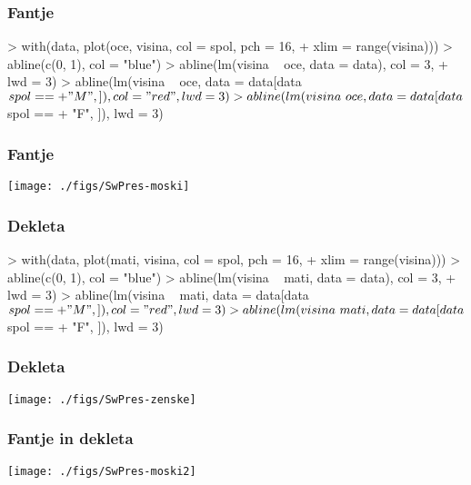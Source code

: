 \begin{frame}[fragile]
\frametitle{Fantje}
\begin{Schunk}
\begin{Sinput}
> with(data, plot(oce, visina, col = spol, pch = 16, 
+     xlim = range(visina)))
> abline(c(0, 1), col = "blue")
> abline(lm(visina ~ oce, data = data), col = 3, 
+     lwd = 3)
> abline(lm(visina ~ oce, data = data[data$spol == 
+     "M", ]), col = "red", lwd = 3)
> abline(lm(visina ~ oce, data = data[data$spol == 
+     "F", ]), lwd = 3)
\end{Sinput}
\end{Schunk}
\end{frame}

\begin{frame}[fragile]
\frametitle{Fantje}
\texttt{[image: ./figs/SwPres-moski]}
\end{frame}
\clearpage
\begin{frame}[fragile]
\frametitle{Dekleta}
\begin{Schunk}
\begin{Sinput}
> with(data, plot(mati, visina, col = spol, pch = 16, 
+     xlim = range(visina)))
> abline(c(0, 1), col = "blue")
> abline(lm(visina ~ mati, data = data), col = 3, 
+     lwd = 3)
> abline(lm(visina ~ mati, data = data[data$spol == 
+     "M", ]), col = "red", lwd = 3)
> abline(lm(visina ~ mati, data = data[data$spol == 
+     "F", ]), lwd = 3)
\end{Sinput}
\end{Schunk}
\end{frame}

\begin{frame}[fragile]
\frametitle{Dekleta}
\texttt{[image: ./figs/SwPres-zenske]}
\end{frame}
\clearpage
{}
\begin{frame}[fragile]
\frametitle{Fantje in dekleta}
\texttt{[image: ./figs/SwPres-moski2]}
\end{frame}



%
%
\clearpage
